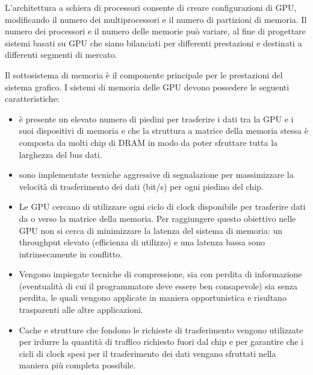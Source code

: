 L'architettura a schiera di processori consente di creare configurazioni di GPU, modificando il numero dei multiprocessori e il numero di partizioni di memoria. Il numero dei processori e il numero delle memorie può variare, al fine di progettare sistemi basati su GPU che siano bilanciati per differenti prestazioni e destinati a differenti segmenti di mercato.

Il sottosistema di memoria è il componente principale per le prestazioni del sistema grafico. I sistemi di memoria delle GPU devono possedere le seguenti caratteristiche:

\begin{itemize}
  \item {} è presente un elevato numero di piedini per trasferire i dati tra  la GPU e i suoi dispositivi di memoria e che la struttura a matrice della memoria stessa è composta da molti chip di DRAM in modo da poter sfruttare tutta la larghezza del bus dati. 
  \item {} sono implementate tecniche aggressive di segnalazione per massimizzare la velocità di trasferimento dei dati (bit/s) per ogni piedino del chip.
  \item Le GPU cercano di utilizzare ogni ciclo di clock disponibile per trasferire dati da o verso la matrice della memoria. Per raggiungere questo obiettivo nelle GPU non si cerca di minimizzare la latenza del sistema di memoria: un throughput elevato (efficienza di utilizzo) e una latenza bassa sono intrinsecamente in conflitto. 
  \item Vengono impiegate tecniche di compressione, sia con perdita di informazione (eventualità di cui il programmatore deve essere ben consapevole) sia senza perdita, le quali vengono applicate in maniera opportunistica e risultano trasparenti alle altre applicazioni. 
  \item Cache e strutture che fondono le richieste di trasferimento vengono utilizzate per irdurre la quantità di traffico richiesto fuori dal chip e per garantire che i cicli di clock spesi per il trasferimento dei dati vengano sfruttati nella maniera più completa possibile.
\end{itemize}


